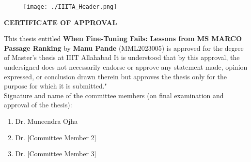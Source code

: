 \begin{figure}[htp]
    \texttt{[image: ./IIITA\_Header.png]}
\end{figure}
\thispagestyle{empty}
\vspace*{.06\textheight}

\begin{spacing}{1.5}
\begin{center}
    {\centering\large\bfseries CERTIFICATE OF APPROVAL \par\vspace{10pt}}
\end{center}

 This thesis entitled \textbf{When Fine-Tuning Fails: Lessons from MS MARCO Passage Ranking}  by \textbf{Manu Pande} (MML2023005) is approved for the degree of Master's thesis at IIIT Allahabad  It is understood that by this approval, the undersigned does not necessarily endorse or approve any statement made, opinion expressed, or conclusion drawn
therein but approves the thesis only for the purpose for which it is submitted."\\[40 pt]

 Signature and name of the committee members (on final examination and approval of the thesis): \\[10 pt]
 \begin{flushleft}
     \begin{enumerate}
         \item Dr. Muneendra Ojha \\[25pt]
         \item Dr. [Committee Member 2]\\[25 pt]
         \item Dr. [Committee Member 3] \\[25 pt]
     \end{enumerate}
 \end{flushleft}
 \vspace{20 pt}
 \begin{flushright}
     \begin{minipage}{0.5\textwidth}
        \flushright \vspace{60 pt}
        \underline{\hspace{6cm}} \\
         \\[80pt]
    \end{minipage}
 \end{flushright}
\end{spacing} 

